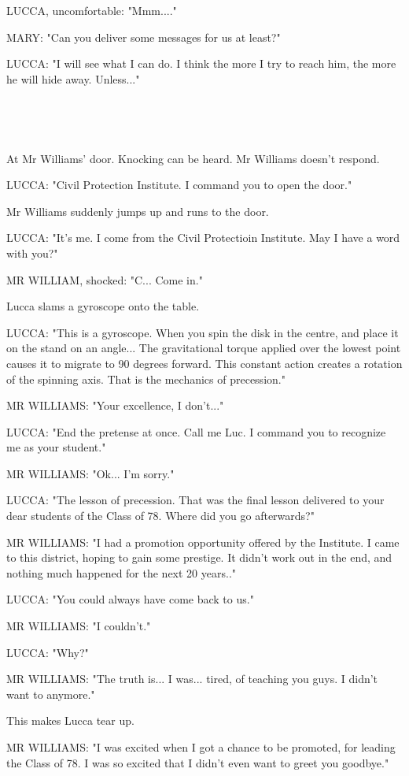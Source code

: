 \documentclass[11pt]{article}
\begin{document}
LUCCA, uncomfortable: "Mmm...."

MARY: "Can you deliver some messages for us at least?"

LUCCA: "I will see what I can do.
I think the more I try to reach him, the more he will hide away.
Unless..."

\ 

\ 

At Mr Williams' door.
Knocking can be heard.
Mr Williams doesn't respond.

LUCCA: "Civil Protection Institute.
I command you to open the door."

Mr Williams suddenly jumps up and runs to the door.

LUCCA: "It's me. I come from the Civil Protectioin Institute.
May I have a word with you?"

MR WILLIAM, shocked: "C... Come in."

Lucca slams a gyroscope onto the table.

LUCCA: "This is a gyroscope.
When you spin the disk in the centre, and place it on the stand on an angle...
The gravitational torque applied over the lowest point causes it to migrate to 90 degrees forward.
This constant action creates a rotation of the spinning axis.
That is the mechanics of precession."

MR WILLIAMS: "Your excellence, I don't..."

LUCCA: "End the pretense at once. Call me Luc. I command you to recognize me as your student."

MR WILLIAMS: "Ok... I'm sorry."

LUCCA: "The lesson of precession. 
That was the final lesson delivered to your dear students of the Class of 78.
Where did you go afterwards?"

MR WILLIAMS: "I had a promotion opportunity offered by the Institute. 
I came to this district, hoping to gain some prestige.
It didn't work out in the end, and nothing much happened for the next 20 years.."

LUCCA: "You could always have come back to us."

MR WILLIAMS: "I couldn't."

LUCCA: "Why?"

MR WILLIAMS: "The truth is... I was... tired, of teaching you guys.
I didn't want to anymore."

This makes Lucca tear up.

MR WILLIAMS: "I was excited when I got a chance to be promoted, for leading the Class of 78.
I was so excited that I didn't even want to greet you goodbye."
\end{document}
